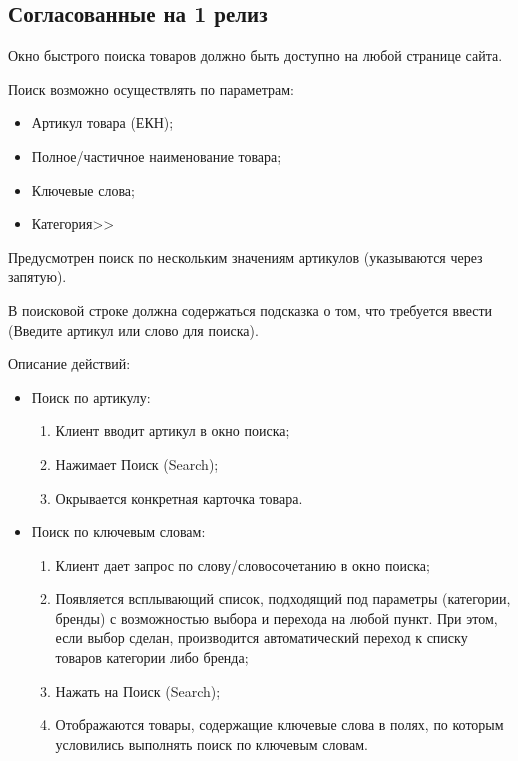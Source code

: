 \subsection{Согласованные на 1 релиз}
\fi
{}
{


\begin{wikilong}
Окно быстрого поиска товаров должно быть доступно на любой странице сайта.

Поиск возможно осуществлять по параметрам:
\begin{itemize}
	\item Артикул товара (ЕКН);
	\item Полное/частичное наименование товара;
	\item Ключевые слова;
	\item Категория>>
\end{itemize}

Предусмотрен поиск по нескольким значениям артикулов (указываются через запятую).

В поисковой строке должна содержаться подсказка о том, что требуется ввести (Введите артикул или слово для поиска).

Описание действий:
\begin{itemize}

\item Поиск по артикулу:
	\begin{enumerate} 
		\item Клиент вводит артикул в окно поиска;
		\item Нажимает Поиск (Search);
		\item Окрывается конкретная карточка товара.
	\end{enumerate}	
	
\item Поиск по ключевым словам:
 	\begin{enumerate} 
	 	\item Клиент дает запрос по слову/словосочетанию в окно поиска;
		\item Появляется всплывающий список, подходящий под параметры (категории, бренды) с возможностью выбора и перехода на любой пункт. При этом, если выбор сделан, производится автоматический переход к списку товаров категории либо бренда;
		\item Нажать на Поиск (Search);
		\item Отображаются товары, содержащие ключевые слова в полях, по которым условились выполнять поиск по ключевым словам.
	\end{enumerate}
	

\end{itemize}
\end{wikilong}}
